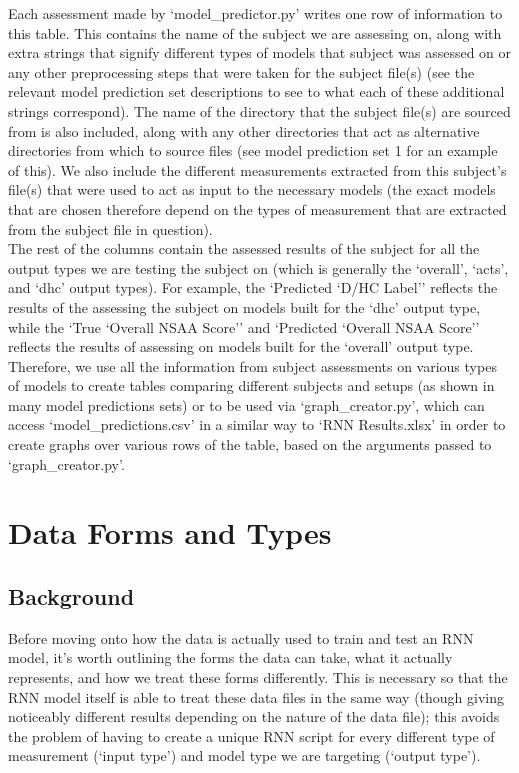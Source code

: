 \documentclass[12pt,twoside]{report}
\begin{document}
\quad Each assessment made by ‘model\_predictor.py’ writes one row of information to this table. This contains the name of the subject we are assessing on, along with extra strings that signify different types of models that subject was assessed on or any other preprocessing steps that were taken for the subject file(s) (see the relevant model prediction set descriptions to see to what each of these additional strings correspond). The name of the directory that the subject file(s) are sourced from is also included, along with any other directories that act as alternative directories from which to source files (see model prediction set 1 for an example of this). We also include the different measurements extracted from this subject’s file(s) that were used to act as input to the necessary models (the exact models that are chosen therefore depend on the types of measurement that are extracted from the subject file in question).\\

\quad The rest of the columns contain the assessed results of the subject for all the output types we are testing the subject on (which is generally the ‘overall’, ‘acts’, and ‘dhc’ output types). For example, the ‘Predicted ‘D/HC Label’’ reflects the results of the assessing the subject on models built for the ‘dhc’ output type, while the ‘True ‘Overall NSAA Score’’ and ‘Predicted ‘Overall NSAA Score’’ reflects the results of assessing on models built for the ‘overall’ output type. Therefore, we use all the information from subject assessments on various types of models to create tables comparing different subjects and setups (as shown in many model predictions sets) or to be used via ‘graph\_creator.py’, which can access ‘model\_predictions.csv’ in a similar way to ‘RNN Results.xlsx’ in order to create graphs over various rows of the table, based on the arguments passed to ‘graph\_creator.py’.




\chapter{Data Forms and Types\\}

\section{Background}

\quad Before moving onto how the data is actually used to train and test an RNN model, it’s worth outlining the forms the data can take, what it actually represents, and how we treat these forms differently. This is necessary so that the RNN model itself is able to treat these data files in the same way (though giving noticeably different results depending on the nature of the data file); this avoids the problem of having to create a unique RNN script for every different type of measurement (‘input type’) and model type we are targeting (‘output type’).
\end{document}

